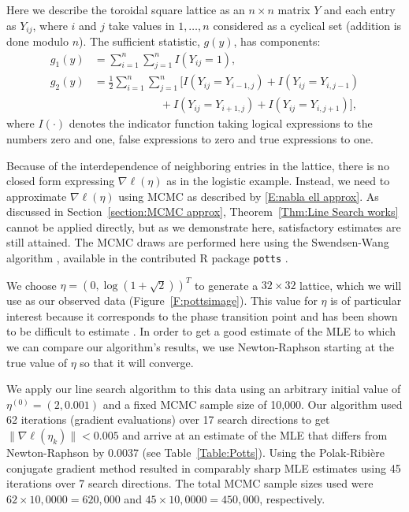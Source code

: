 \documentclass[oneside]{myumnStatThesis}
\begin{document}
Here we describe the toroidal square lattice as an $n \times n$ matrix $Y$ and each entry as $Y_{ij}$, where $i$ and $j
$ take values in $1, \ldots, n$ considered as a cyclical set (addition is done modulo $n$).  The sufficient statistic, 
$g(y)$, has components:
\begin{align*}
	g_1(y) &= \sum_{i=1}^n \sum_{j=1}^n I(Y_{ij}=1), \\
	g_2(y) &= \frac{1}{2} \sum_{i=1}^n \sum_{j=1}^n 
				\bigl[ I(Y_{ij}=Y_{i-1,j}) + I(Y_{ij}=Y_{i,j-1}) \\
							&\qquad \qquad \qquad + I(Y_{ij}=Y_{i+1,j}) + I(Y_{ij}=Y_{i,j+1}) \bigr ]
				,
\end{align*}  
where $I(\cdot)$ denotes the indicator function taking logical expressions to the numbers zero and one, false 
expressions to zero and true expressions to one.  

Because of the interdependence of neighboring entries in the lattice, there is no closed form expressing $\nabla \ell
( \eta)$ as in the logistic example.  Instead, we need to approximate $\nabla \ell( \eta)$ using MCMC as described by 
\eqref{E:nabla ell approx}.  As discussed in Section~\ref{section:MCMC approx}, Theorem~\ref{Thm:Line Search works} 
cannot be applied directly, but as we demonstrate here, satisfactory estimates are still attained.  The MCMC draws are 
performed here using the Swendsen-Wang algorithm \citep{Swendsen-Wang:1987,Swendsen-Wang:1990}, available in the contributed R 
package \texttt{potts} \citep{Geyer:potts}.

We choose $\eta = \left(0, \log(1 + \sqrt{2} ) \right)^T$ to generate a $32 \times 32$ lattice, which we will use as 
our observed data (Figure~\ref{F:pottsimage}).  This value for $\eta$ is of particular interest because it corresponds 
to the phase transition point \citep{Potts} and has been shown to be difficult to estimate \citep{Geyer:1990}.  In 
order to get a good estimate of the MLE to which we can compare our algorithm's results, we use Newton-Raphson starting 
at the true value of $\eta$ so that it will converge.

We apply our line search algorithm to this data using an arbitrary initial value of $\eta^{(0)} = ( 2, 0.001)$ and a 
fixed MCMC sample size of 10,000.  Our algorithm used 62 iterations (gradient evaluations) over 17 search directions to 
get  $\lVert \nabla \ell( \eta_k ) \rVert < 0.005$ and arrive at an estimate of the MLE that differs from Newton-Raphson
by 0.0037 (see Table~\ref{Table:Potts}).   Using the Polak-Ribi\`{e}re conjugate gradient method resulted in 
comparably sharp MLE estimates using 45 iterations over 7 search directions.  The total MCMC sample sizes used were $62\times10,0000 = 620,000$ and $45\times10,0000 = 450,000$, respectively.
\end{document}
